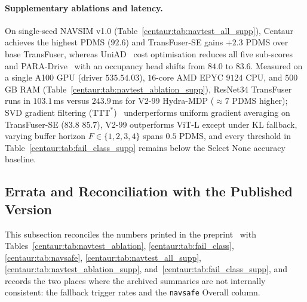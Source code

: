 \paragraph{Supplementary ablations and latency.} On single-seed NAVSIM v1.0 (Table~\ref{centaur:tab:navtest_all_supp}), Centaur achieves the highest PDMS ($92.6$) and TransFuser-SE gains $+2.3$ PDMS over base TransFuser, whereas UniAD~\cite{hu2023uniad} cost optimisation reduces all five sub-scores and PARA-Drive~\cite{weng2024paradrive} with an occupancy head shifts from $84.0$ to $83.6$. Measured on a single A100 GPU (driver $535.54.03$), $16$-core AMD EPYC $9124$ CPU, and $500$\,GB RAM (Table~\ref{centaur:tab:navtest_ablation_supp}), ResNet34 TransFuser runs in $103.1$\,ms versus $243.9$\,ms for \mbox{V2-99} Hydra-MDP ($\approx 7$ PDMS higher); SVD gradient filtering ($\text{TTT}^{*}$)~\cite{Gao2024fstta} underperforms uniform gradient averaging on TransFuser-SE ($83.8$ \vs $85.7$), \mbox{V2-99} outperforms ViT-L except under KL fallback, varying buffer horizon $F \in \{1,2,3,4\}$ spans $0.5$ PDMS, and every threshold in Table~\ref{centaur:tab:fail_class_supp} remains below the Select None accuracy baseline.

\subsection{Errata and Reconciliation with the Published Version}\label{centaur:app:consistency}

This subsection reconciles the numbers printed in the preprint~\cite{sima2024centaur} with Tables~\ref{centaur:tab:navtest_ablation}, \ref{centaur:tab:fail_class}, \ref{centaur:tab:navsafe}, \ref{centaur:tab:navtest_all_supp}, \ref{centaur:tab:navtest_ablation_supp}, and~\ref{centaur:tab:fail_class_supp}, and records the two places where the archived summaries are not internally consistent: the fallback trigger rates and the \texttt{navsafe} Overall column.

